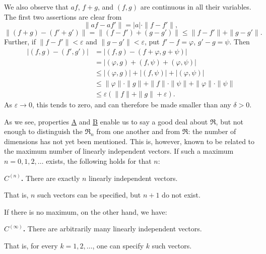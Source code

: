 \documentclass[fontsize=13pt,twoside,openany,headings=normal,parskip=false,bookmarkpackage=false,DIV=calc]{scrbook}
\begin{document}
We also observe that $af$, $f+g$, and $(f,g)$ are continuous in all their variables. The first two assertions are clear from
\[
\|af-af'\|=|a|\cdot\|f-f'\|,
\]
\[
\|(f+g)-(f'+g')\|
=\|(f-f')+(g-g')\|\leq\|f-f'\|+\|g-g'\|.
\]
Further, if $\|f-f'\|<\varepsilon$ and $\|g-g'\|<\varepsilon$, put $f'-f=\varphi$, $g'-g=\psi$. Then
\begin{align*}
|(f,g)-(f',g')|
&=|(f,g)-(f+\varphi,g+\psi)|\\
&=|(\varphi,g)+(f,\psi)+(\varphi,\psi)|\\
&\leq|(\varphi,g)|+|(f,\psi)|+|(\varphi,\psi)|\\
&\leq\|\varphi\|\cdot\|g\|+\|f\|\cdot\|\psi\|
+\|\varphi\|\cdot\|\psi\|\\
&\leq\varepsilon(\|f\|+\|g\|+\varepsilon).
\end{align*}
As $\varepsilon\to0$, this tends to zero, and can therefore be made smaller than any $\delta>0$.

As we see, properties \hyperref[ax:II.A]{A} and \hyperref[ax:II.B]{B} enable us to say a good deal about $\mathfrak{R}$, but not enough to distinguish the $\mathfrak{R}_n$ from one another and from $\mathfrak{R}$: the number of dimensions has not yet been mentioned. This is, however, known to be related to the maximum number of linearly independent vectors. If such a maximum $n=0,1,2,\ldots$ exists, the following holds for that $n$:

\leavevmode{}\textbf{$C^{(n)}$.}\label{ax:II.Cn} There are exactly $n$ linearly independent vectors.

\hypertarget{origpage-24}{}%
That is, $n$ such vectors can be specified, but $n+1$ do not exist.

If there is no maximum, on the other hand, we have:

\leavevmode{}\textbf{$C^{(\infty)}$.}\label{ax:II.Cinfty} There are arbitrarily many linearly independent vectors.

That is, for every $k=1,2,\ldots$, one can specify $k$ such vectors.
\end{document}
